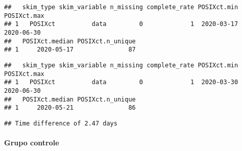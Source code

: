 \documentclass[
]{article}
\newenvironment{Shaded}{\begin{snugshade}}{\end{snugshade}}
\newcommand{\AttributeTok}[1]{\textcolor[rgb]{0.77,0.63,0.00}{#1}}
\newcommand{\FunctionTok}[1]{\textcolor[rgb]{0.00,0.00,0.00}{#1}}
\newcommand{\NormalTok}[1]{#1}
\newcommand{\SpecialCharTok}[1]{\textcolor[rgb]{0.00,0.00,0.00}{#1}}
\newcommand{\StringTok}[1]{\textcolor[rgb]{0.31,0.60,0.02}{#1}}
\begin{document}
\begin{verbatim}
##   skim_type skim_variable n_missing complete_rate POSIXct.min POSIXct.max
## 1   POSIXct          data         0             1  2020-03-17  2020-06-30
##   POSIXct.median POSIXct.n_unique
## 1     2020-05-17               87
\end{verbatim}

\begin{Shaded}
\end{Shaded}

\begin{verbatim}
##   skim_type skim_variable n_missing complete_rate POSIXct.min POSIXct.max
## 1   POSIXct          data         0             1  2020-03-30  2020-06-30
##   POSIXct.median POSIXct.n_unique
## 1     2020-05-21               86
\end{verbatim}

\begin{Shaded}
\end{Shaded}

\begin{verbatim}
## Time difference of 2.47 days
\end{verbatim}

\hypertarget{grupo-controle-2}{%
\paragraph{\texorpdfstring{\textbf{Grupo
controle}}{Grupo controle}}\label{grupo-controle-2}}

\begin{Shaded}
\end{Shaded}
\end{document}
